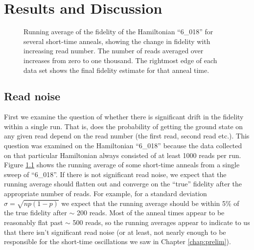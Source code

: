 \chapter{Results and Discussion}
\begin{figure}
	\caption[Running Fidelity Average]{Running average of the fidelity of the Hamiltonian ``6\_018'' for several short-time anneals, showing the change in fidelity with increasing read number.  The number of reads averaged over increases from zero to one thousand.  The rightmost edge of each data set shows the final fidelity estimate for that anneal time.  }
	\label{fig:running_avg}
\end{figure}
\section{Read noise}
First we examine the question of whether there is significant drift in the fidelity within a single run.  That is, does the probability of getting the ground state on any given read depend on the read number (the first read, second read etc.).  This question was examined on the Hamiltonian ``6\_018'' because the data collected on that particular Hamiltonian always consisted of at least 1000 reads per run.
Figure \ref{fig:running_avg} shows the running average of some short-time anneals from a single sweep of ``6\_018''.  If there is not significant read noise, we expect that the running average should flatten out and converge on the ``true'' fidelity after the appropriate number of reads.  For example, for a standard deviation $\sigma = \sqrt{np(1-p)}$ we expect that the running average should be within 5\% of the true fidelity after $\sim$ 200 reads.  Most of the anneal times appear to be reasonably flat past $\sim$ 500 reads, so the running averages appear to indicate to us that there isn't significant read noise (or at least, not nearly enough to be responsible for the short-time oscillations we saw in Chapter \ref{chap:prelim}).

